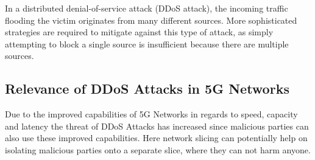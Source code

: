 In a distributed denial-of-service attack (DDoS attack), the incoming traffic flooding the victim originates from many different sources. More sophisticated strategies are required to mitigate against this type of attack, as simply attempting to block a single source is insufficient because there are multiple sources.

\subsection{Relevance of DDoS Attacks in 5G Networks}
Due to the improved capabilities of 5G Networks in regards to speed, capacity and latency the threat of DDoS Attacks has increased since malicious parties can also use these improved capabilities. Here network slicing can potentially help on isolating malicious parties onto a separate slice, where they can not harm anyone.\cite{sattar2019towards}
